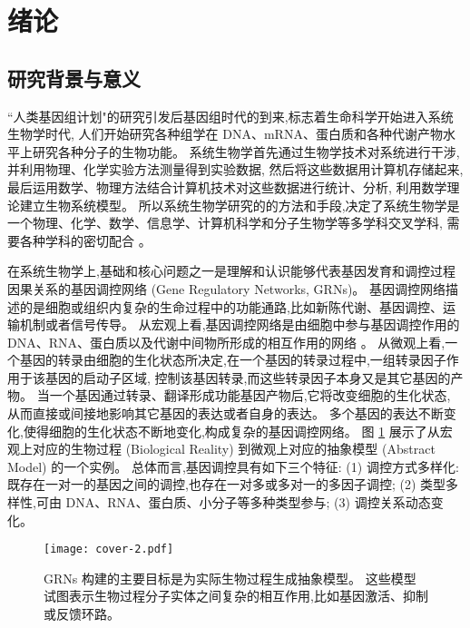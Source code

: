\section{绪论}
\subsection{研究背景与意义}

``人类基因组计划"的研究引发后基因组时代的到来,标志着生命科学开始进入系统生物学时代,
人们开始研究各种组学在 DNA、mRNA、蛋白质和各种代谢产物水平上研究各种分子的生物功能。
系统生物学首先通过生物学技术对系统进行干涉,并利用物理、化学实验方法测量得到实验数据,
然后将这些数据用计算机存储起来,最后运用数学、物理方法结合计算机技术对这些数据进行统计、分析,
利用数学理论建立生物系统模型。
所以系统生物学研究的的方法和手段,决定了系统生物学是一个物理、化学、数学、信息学、计算机科学和分子生物学等多学科交叉学科,
需要各种学科的密切配合 。

在系统生物学上,基础和核心问题之一是理解和认识能够代表基因发育和调控过程因果关系的基因调控网络 (Gene Regulatory Networks, GRNs)。
基因调控网络描述的是细胞或组织内复杂的生命过程中的功能通路,比如新陈代谢、基因调控、运输机制或者信号传导。
从宏观上看,基因调控网络是由细胞中参与基因调控作用的 DNA、RNA、蛋白质以及代谢中间物所形成的相互作用的网络 。
从微观上看,一个基因的转录由细胞的生化状态所决定,在一个基因的转录过程中,一组转录因子作用于该基因的启动子区域,
控制该基因转录,而这些转录因子本身又是其它基因的产物。
当一个基因通过转录、翻译形成功能基因产物后,它将改变细胞的生化状态,
从而直接或间接地影响其它基因的表达或者自身的表达。
多个基因的表达不断变化,使得细胞的生化状态不断地变化,构成复杂的基因调控网络。
图 \ref{cover-2} 展示了从宏观上对应的生物过程 (Biological Reality) 到微观上对应的抽象模型 (Abstract Model) 的一个实例。
总体而言,基因调控具有如下三个特征: 
(1) 调控方式多样化: 既存在一对一的基因之间的调控,也存在一对多或多对一的多因子调控;
(2) 类型多样性,可由 DNA、RNA、蛋白质、小分子等多种类型参与;
(3) 调控关系动态变化。

\begin{figure}[!htbp]
    \centering
    \texttt{[image: cover-2.pdf]}
    \caption{GRNs 构建的主要目标是为实际生物过程生成抽象模型。
    这些模型试图表示生物过程分子实体之间复杂的相互作用,比如基因激活、抑制或反馈环路。
    }
    \label{cover-2}
\end{figure}

